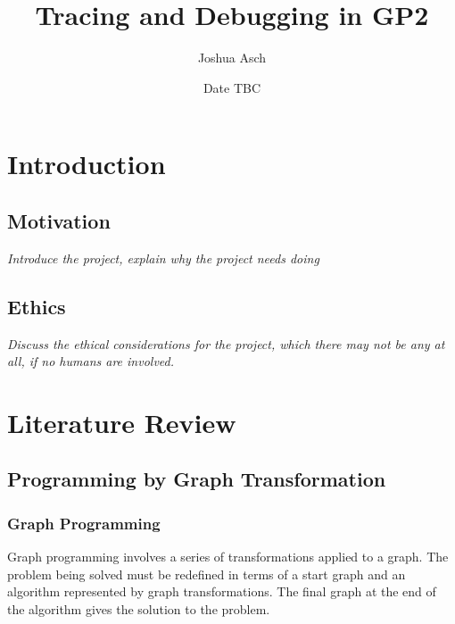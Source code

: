 \documentclass[authoryearcitations]{UoYCSproject}
\author{Joshua Asch}
\title{Tracing and Debugging in GP2}
\date{Date TBC}
\begin{document}
\maketitle
\listoffigures
\listoftables

\cleardoublepage


\chapter{Introduction}
\label{cha:Introduction}

\section{Motivation}
\label{sec:Motivation}

\emph{Introduce the project, explain why the project needs doing}


\section{Ethics}
\label{sec:Ethics}

\emph{Discuss the ethical considerations for the project, which there may
not be any at all, if no humans are involved.}

\clearpage


\chapter{Literature Review}
\label{cha:LiteratureReview}

\section{Programming by Graph Transformation}
\label{sec:ProgrammingByGraphTransformation}

\subsection{Graph Programming}
\label{sec:GraphProgramming}

Graph programming involves a series of transformations applied to a graph. The
problem being solved must be redefined in terms of a start graph and an algorithm
represented by graph transformations. The final graph at the end of the algorithm
gives the solution to the problem.
\end{document}
